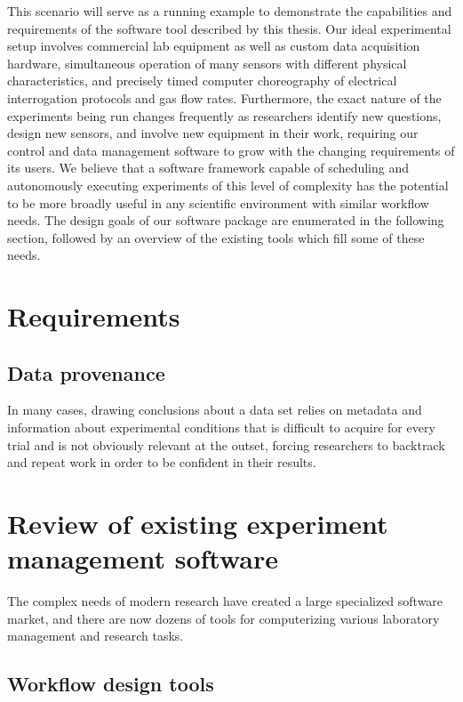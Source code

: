 \documentclass[../thesis]{subfiles}
\begin{document}
This scenario will serve as a running example to demonstrate the
capabilities and requirements of the software tool described by this
thesis. Our ideal experimental setup involves commercial lab equipment
as well as custom data acquisition hardware, simultaneous operation of
many sensors with different physical characteristics, and precisely
timed computer choreography of electrical interrogation protocols and
gas flow rates. Furthermore, the exact nature of the experiments being
run changes frequently as researchers identify new questions, design
new sensors, and involve new equipment in their work,
requiring our control and data management software to grow with the
changing requirements of its users. We believe that a software
framework capable of scheduling and autonomously executing experiments
of this level of complexity has the potential to be more broadly
useful in any scientific environment with similar workflow needs. The
design goals of our software package are enumerated in the following section,
followed by an overview of the existing tools which fill some of these needs.



\section{Requirements}

\subsection{Data provenance}
In many cases, drawing conclusions about a data set relies on
metadata and information about experimental conditions that is
difficult to acquire for every trial and is not obviously
relevant at the outset, forcing researchers to backtrack and repeat
work in order to be confident in their results.



\section{Review of existing experiment management software}

The complex needs of modern research have created a large specialized
software market, and there are now dozens of tools for computerizing
various laboratory management and research tasks.

\subsection{Workflow design tools}
\end{document}
